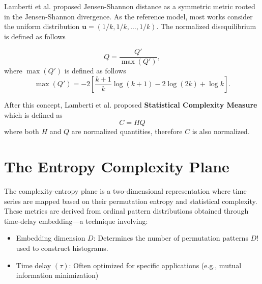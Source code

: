 Lamberti et al. \cite{lamberti2004intensive} proposed Jensen-Shannon distance as a symmetric metric rooted in the Jensen-Shannon divergence. As the reference model, most works consider the uniform distribution $\mathbf{u}=(1/k,1/k, \dots, 1/k)$. The normalized disequilibrium is defined as follows

\begin{equation}
	Q=\dfrac{Q'}{\max{(Q')}},
\end{equation}
where $\max(Q')$ is defined as follows
\begin{equation}
	\max(Q')=-2 \left[\dfrac{k+1}{k}\log(k+1)-2\log(2k)+\log k\right].
\end{equation}

After this concept, Lamberti et al. \cite{lamberti2004intensive} proposed \textbf{Statistical Complexity Measure} which is defined as 
\begin{equation}
	C=HQ
\end{equation}
where both $H$ and $Q$ are normalized quantities, therefore $C$ is also normalized. 
  
\section{The Entropy Complexity Plane}
The complexity-entropy plane is a two-dimensional representation where time series are mapped based on their permutation entropy and statistical complexity. These metrics are derived from ordinal pattern distributions obtained through time-delay embedding—a technique involving:
\begin{itemize}
	\item Embedding dimension $D$: Determines the number of permutation patterns $D!$ used to construct histograms.
	\item Time delay $(\tau)$: Often optimized for specific applications (e.g., mutual information minimization)  
\end{itemize} 

